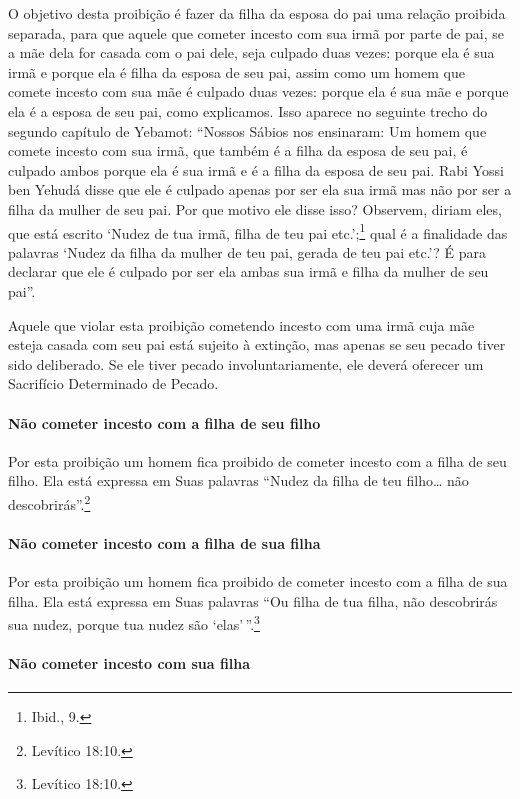 O objetivo desta proibição é fazer da filha da esposa do pai uma relação
proibida separada, para que aquele que cometer incesto com sua irmã por
parte de pai, se a mãe dela for casada com o pai dele, seja culpado duas
vezes: porque ela é sua irmã e porque ela é filha da esposa de seu pai,
assim como um homem que comete incesto com sua mãe é culpado duas vezes:
porque ela é sua mãe e porque ela é a esposa de seu pai, como
explicamos. Isso aparece no seguinte trecho do segundo capítulo de
Yebamot: ``Nossos Sábios nos ensinaram: Um homem que comete incesto com
sua irmã, que também é a filha da esposa de seu pai, é culpado ambos
porque ela é sua irmã e é a filha da esposa de seu pai. Rabi Yossi ben
Yehudá disse que ele é culpado apenas por ser ela sua irmã mas não por
ser a filha da mulher de seu pai. Por que motivo ele disse isso?
Observem, diriam eles, que está escrito `Nudez de tua irmã, filha de teu
pai etc.';\footnote{Ibid., 9.} qual é a finalidade das palavras `Nudez da filha
da mulher de teu pai, gerada de teu pai etc.'? É para declarar que ele
é culpado por ser ela ambas sua irmã e filha da mulher de seu pai''.

Aquele que violar esta proibição cometendo incesto com uma irmã cuja mãe
esteja casada com seu pai está sujeito à extinção, mas apenas se seu
pecado tiver sido deliberado. Se ele tiver pecado involuntariamente, ele
deverá oferecer um Sacrifício Determinado de Pecado.

\paragraph{Não cometer incesto com a filha de seu filho}

Por esta proibição um homem fica proibido de cometer incesto com a filha
de seu filho. Ela está expressa em Suas palavras ``Nudez da filha de teu
filho\ldots{} não descobrirás''.\footnote{Levítico 18:10.}

\paragraph{Não cometer incesto com a filha de sua filha}

Por esta proibição um homem fica proibido de cometer incesto com a filha
de sua filha. Ela está expressa em Suas palavras ``Ou filha de tua
filha, não descobrirás sua nudez, porque tua nudez são `elas'\,''.\footnote{Levítico 18:10.}

\paragraph{Não cometer incesto com sua filha}

